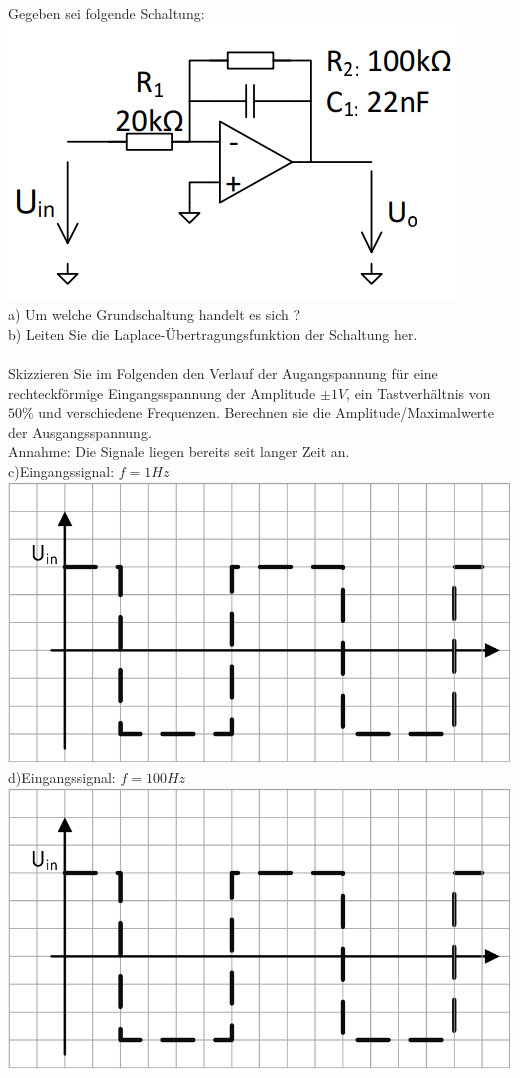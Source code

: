\documentclass[A4]{scrartcl}
\begin{document}
  Gegeben sei folgende Schaltung:\\
  \includegraphics{Schaltung6.png}\\
  a) Um welche Grundschaltung handelt es sich ?\\
  b) Leiten Sie die Laplace-Übertragungsfunktion der Schaltung her.\\\\
  Skizzieren Sie im Folgenden den Verlauf der Augangspannung für eine rechteckförmige Eingangsspannung der Amplitude $\pm 1V$, ein Tastverhältnis von $50\%$ und verschiedene Frequenzen.
  Berechnen sie die Amplitude/Maximalwerte der Ausgangsspannung.\\
  Annahme: Die Signale liegen bereits seit langer Zeit an.\\
  c)Eingangssignal: $f=1Hz$\\
  \includegraphics{U_rechteck.png}\\
  d)Eingangssignal: $f=100Hz$\\
  \includegraphics{U_rechteck.png}\\
\end{document}
